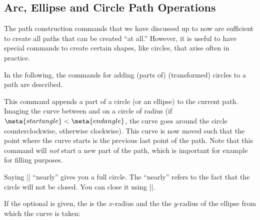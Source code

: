 \subsection{Arc, Ellipse and Circle Path Operations}

The path construction commands that we have discussed up to now are
sufficient to create all paths that can be created ``at all.''
However, it is useful to have special commands to create certain
shapes, like circles, that arise often in practice.

In the following, the commands for adding (parts of) (transformed)
circles to a path are described.

\begin{command}{\pgfpatharc{}}
  This command appends a part of a circle (or an ellipse) to the current
  path. Imaging the curve between  and  on a circle of radius  (if $\meta{start angle}
  < \meta{end angle}$, the curve goes around the circle
  counterclockwise, otherwise clockwise). This curve is now moved such
  that the point where the curve starts is the previous last point of the
  path. Note that this command will \emph{not} start a new part of the
  path, which is important for example for filling purposes.

\begin{codeexample}[]
\end{codeexample}

  Saying || ``nearly'' gives you a full
  circle. The ``nearly'' refers to the fact that the circle will not
  be closed. You can close it using |\pgfpathclose|.

  If the optional  is given, the  is the
  $x$-radius and the  the $y$-radius of the ellipse
  from which the curve is taken:

\begin{codeexample}[]
\end{codeexample}


\end{command}
